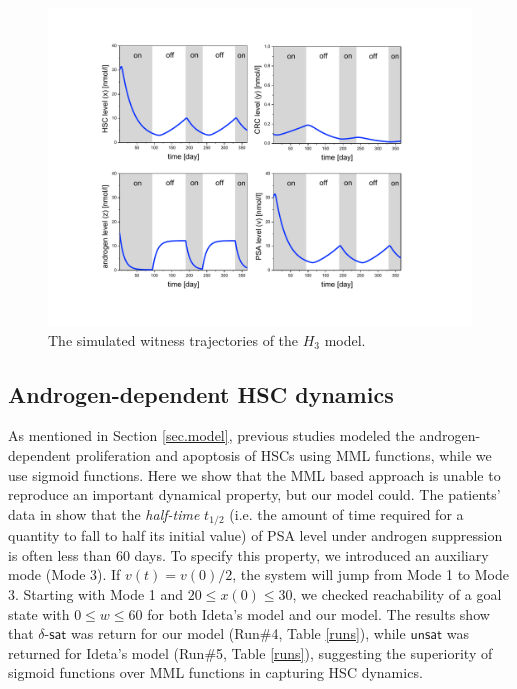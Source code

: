 \begin{figure}[htb]
\centering
\includegraphics[scale=0.48]{fig-witness}
\caption{The simulated witness trajectories of the $H_3$ model.}
\label{prostate-fig1}
\end{figure}

\subsection{Androgen-dependent HSC dynamics}

As mentioned in Section \ref{sec.model}, previous studies \cite{jackson04a,jackson04b,ideta08} modeled the androgen-dependent proliferation and apoptosis of HSCs using MML functions, while we use sigmoid functions. Here we show that the MML based approach is unable to reproduce an important dynamical property, but our model could. The patients' data in \cite{ bruchovsky06,bruchovsky07} show that the \textit{half-time} $t_{1/2}$ (i.e. the amount of time required for a quantity to fall to half its initial value) of PSA level under androgen suppression is often less than $60$ days. To specify this property, we introduced an auxiliary mode (Mode 3). If $v(t)=v(0)/2$, the system will jump from Mode 1 to Mode 3. Starting with Mode 1 and $20 \le x(0) \le 30$, we checked reachability of a goal state with $0 \le w \le 60$ for both Ideta's model \cite{ideta08} and our model. The results show that  $\delta$-$\mathsf{sat}$ was return for our model (Run\#4, Table \ref{runs}), while $\mathsf{unsat}$ was returned for Ideta's model (Run\#5, Table \ref{runs}), suggesting the superiority of sigmoid functions over MML functions in capturing HSC dynamics.


